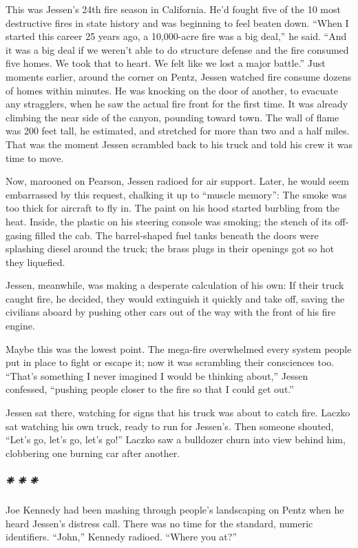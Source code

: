 This was Jessen's 24th fire season in California. He'd fought five of
the 10 most destructive fires in state history and was beginning to feel
beaten down. ``When I started this career 25 years ago, a 10,000-acre
fire was a big deal,'' he said. ``And it was a big deal if we weren't
able to do structure defense and the fire consumed five homes. We took
that to heart. We felt like we lost a major battle.'' Just moments
earlier, around the corner on Pentz, Jessen watched fire consume dozens
of homes within minutes. He was knocking on the door of another, to
evacuate any stragglers, when he saw the actual fire front for the first
time. It was already climbing the near side of the canyon, pounding
toward town. The wall of flame was 200 feet tall, he estimated, and
stretched for more than two and a half miles. That was the moment Jessen
scrambled back to his truck and told his crew it was time to move.

Now, marooned on Pearson, Jessen radioed for air support. Later, he
would seem embarrassed by this request, chalking it up to ``muscle
memory'': The smoke was too thick for aircraft to fly in. The paint on
his hood started burbling from the heat. Inside, the plastic on his
steering console was smoking; the stench of its off-gasing filled the
cab. The barrel-shaped fuel tanks beneath the doors were splashing
diesel around the truck; the brass plugs in their openings got so hot
they liquefied.

Jessen, meanwhile, was making a desperate calculation of his own: If
their truck caught fire, he decided, they would extinguish it quickly
and take off, saving the civilians aboard by pushing other cars out of
the way with the front of his fire engine.

Maybe this was the lowest point. The mega-fire overwhelmed every system
people put in place to fight or escape it; now it was scrambling their
consciences too. ``That's something I never imagined I would be thinking
about,'' Jessen confessed, ``pushing people closer to the fire so that I
could get out.''

Jessen sat there, watching for signs that his truck was about to catch
fire. Laczko sat watching his own truck, ready to run for Jessen's. Then
someone shouted, ``Let's go, let's go, let's go!'' Laczko saw a
bulldozer churn into view behind him, clobbering one burning car after
another.

\hypertarget{---8}{%
\subparagraph{❈ ❈ ❈}\label{---8}}

Joe Kennedy had been mashing through people's landscaping on Pentz when
he heard Jessen's distress call. There was no time for the standard,
numeric identifiers. ``John,'' Kennedy radioed. ``Where you at?''

